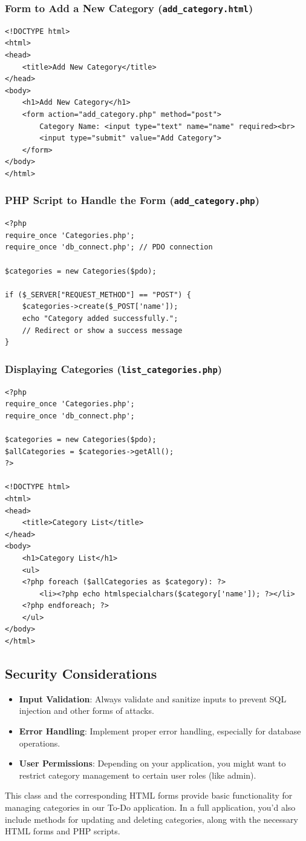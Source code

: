 \documentclass[11pt]{article}
\begin{document}
\subsubsection{Form to Add a New Category (\texttt{add\_category.html})}
\label{sec:org6e2a987}
\begin{verbatim}
<!DOCTYPE html>
<html>
<head>
    <title>Add New Category</title>
</head>
<body>
    <h1>Add New Category</h1>
    <form action="add_category.php" method="post">
        Category Name: <input type="text" name="name" required><br>
        <input type="submit" value="Add Category">
    </form>
</body>
</html>
\end{verbatim}

\subsubsection{PHP Script to Handle the Form (\texttt{add\_category.php})}
\label{sec:org85e8007}
\begin{verbatim}
<?php
require_once 'Categories.php';
require_once 'db_connect.php'; // PDO connection

$categories = new Categories($pdo);

if ($_SERVER["REQUEST_METHOD"] == "POST") {
    $categories->create($_POST['name']);
    echo "Category added successfully.";
    // Redirect or show a success message
}
\end{verbatim}

\subsubsection{Displaying Categories (\texttt{list\_categories.php})}
\label{sec:orgd4d6507}
\begin{verbatim}
<?php
require_once 'Categories.php';
require_once 'db_connect.php';

$categories = new Categories($pdo);
$allCategories = $categories->getAll();
?>

<!DOCTYPE html>
<html>
<head>
    <title>Category List</title>
</head>
<body>
    <h1>Category List</h1>
    <ul>
    <?php foreach ($allCategories as $category): ?>
        <li><?php echo htmlspecialchars($category['name']); ?></li>
    <?php endforeach; ?>
    </ul>
</body>
</html>
\end{verbatim}

\subsection{Security Considerations}
\label{sec:org4cc838c}
\begin{itemize}
\item \textbf{Input Validation}: Always validate and sanitize inputs to prevent SQL
injection and other forms of attacks.
\item \textbf{Error Handling}: Implement proper error handling, especially for
database operations.
\item \textbf{User Permissions}: Depending on your application, you might want to
restrict category management to certain user roles (like admin).
\end{itemize}

This class and the corresponding HTML forms provide basic functionality
for managing categories in our To-Do application. In a full
application, you'd also include methods for updating and deleting
categories, along with the necessary HTML forms and PHP scripts.
\end{document}
